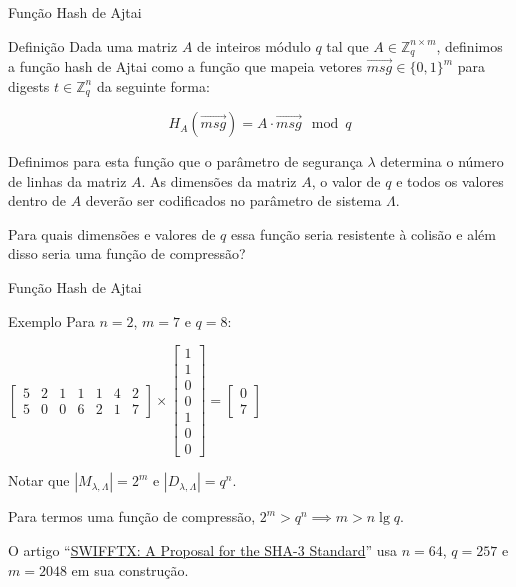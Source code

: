 \documentclass{beamer}
\begin{document}
\begin{frame}{Função Hash de Ajtai}

\begin{block}{Definição}
Dada uma matriz $A$ de inteiros módulo $q$ tal que $A \in
\mathbb{Z}_q^{n\times m}$, definimos a função hash de Ajtai como a função que mapeia vetores $\overrightarrow{msg} \in \{0,1\}^{m}$ para digests $t \in \mathbb{Z}_q^n$ da seguinte forma:

$$
H_A(\overrightarrow{msg}) = A\cdot \overrightarrow{msg} \mod q
$$
\end{block}

Definimos para esta função que o parâmetro de segurança $\lambda$ determina o número de linhas da matriz $A$. As dimensões da matriz $A$, o valor de $q$ e todos os valores dentro de $A$ deverão ser codificados no parâmetro de sistema $\Lambda$.

Para quais dimensões e valores de $q$ essa função seria resistente à colisão e além disso seria uma função de compressão?



\end{frame}

\begin{frame}{Função Hash de Ajtai}

\begin{block}{Exemplo}
Para $n=2$, $m=7$ e $q=8$:

$\begin{bmatrix}5 & 2 & 1 & 1 & 1 & 4 & 2\\5&0&0&6&2&1&7\end{bmatrix}\times\begin{bmatrix}1\\1\\0\\0\\1\\0\\0\end{bmatrix}=\begin{bmatrix}0\\7\end{bmatrix}$
\end{block}

Notar que $|M_{\lambda,\Lambda}|=2^m$ e $|D_{\lambda,\Lambda}|=q^n$.

Para termos uma função de compressão, $2^m>q^n \implies m > n\lg q$.

O artigo ``\href{https://web.eecs.umich.edu/~cpeikert/pubs/swifftx.pdf}{SWIFFTX: A Proposal for the SHA-3 Standard}'' usa $n=64$, $q=257$ e $m=2048$ em sua construção.

\end{frame}
\end{document}
